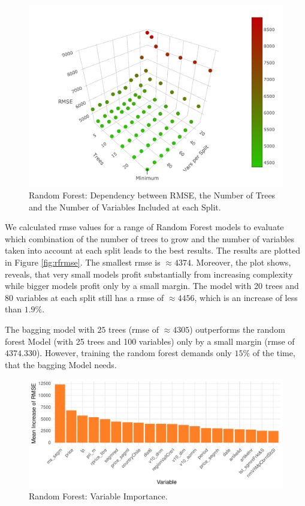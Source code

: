\documentclass[11pt,]{article}
\begin{document}
\begin{figure}

{\centering \includegraphics{../00_data/output_paper/10_rf_plot} 

}

\caption[RMSE's of the Random Forest for Different Parameters]{\label{fig:rfrmse}Random Forest: Dependency between RMSE, the Number of Trees and the Number of Variables Included at each Split.}\label{fig:unnamed-chunk-10}
\end{figure}

We calculated \ac{rmse} values for a range of Random Forest models to
evaluate which combination of the number of trees to grow and the number
of variables taken into account at each split leads to the best results.
The results are plotted in Figure \ref{fig:rfrmse}. The smallest
\ac{rmse} is \(\approx 4374\). Moreover, the plot shows, reveals, that
very small models profit substantially from increasing complexity while
bigger models profit only by a small margin. The model with 20 trees and
80 variables at each split still has a \ac{rmse} of \(\approx 4456\),
which is an increase of less than \(1.9\%\).

The \ac{bagging} model with \(25\) trees (\ac{rmse} of \(\approx 4305\))
outperforms the random forest Model (with 25 trees and 100 variables)
only by a small margin (\ac{rmse} of \(4374.330\)). However, training
the random forest demands only \(15\%\) of the time, that the
\ac{bagging} Model needs.

\begin{figure}
\centering
\includegraphics{../00_data/output_paper/11_var_imp_random_forest_bp.pdf}
\caption{\label{fig:rfimp}Random Forest: Variable Importance.}
\end{figure}
\end{document}
